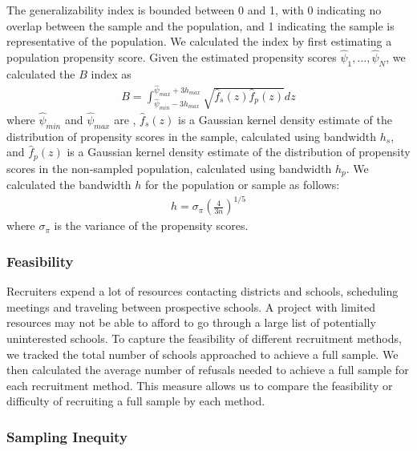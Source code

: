 \documentclass[
  english,
  man,floatsintext]{apa6}
\begin{document}
The generalizability index is bounded between 0 and 1, with 0 indicating no overlap between the sample and the population, and 1 indicating the sample is representative of the population.
We calculated the index by first estimating a population propensity score.
Given the estimated propensity scores \(\hat\psi_1,...,\hat\psi_N\), we calculated the \(B\) index as
\begin{align}
B = \int_{\hat\psi_{min}-3h_{max}}^{\hat\psi_{max}+3h_{max}}\sqrt{\hat{f}_s(z)\hat{f}_p(z)}dz
\end{align}
where \(\hat\psi_{min}\) and \(\hat\psi_{max}\) are , \(\hat{f}_s(z)\) is a Gaussian kernel density estimate of the distribution of propensity scores in the sample, calculated using bandwidth \(h_s\), and \(\hat{f}_p(z)\) is a Gaussian kernel density estimate of the distribution of propensity scores in the non-sampled population, calculated using bandwidth \(h_p\). We calculated the bandwidth \(h\) for the population or sample as follows:
\begin{align}
h = \sigma_{\pi}(\frac{4}{3n})^{1/5}
\end{align}
where \(\sigma_{\pi}\) is the variance of the propensity scores. 

\hypertarget{feasibility}{%
\subsubsection{Feasibility}\label{feasibility}}

Recruiters expend a lot of resources contacting districts and schools, scheduling meetings and traveling between prospective schools. A project with limited resources may not be able to afford to go through a large list of potentially uninterested schools. To capture the feasibility of different recruitment methods, we tracked the total number of schools approached to achieve a full sample. We then calculated the average number of refusals needed to achieve a full sample for each recruitment method. This measure allows us to compare the feasibility or difficulty of recruiting a full sample by each method.

\hypertarget{sampling-inequity}{%
\subsubsection{Sampling Inequity}\label{sampling-inequity}}
\end{document}
